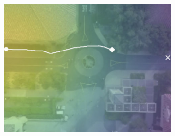 \documentclass[letterpaper,10pt,conference]{ieeeconf}
\begin{document}
\begin{figure}[t!]
\begin{subfigure}[t]{0.48\textwidth}
\begin{minipage}[c]{0.3\linewidth}
		\includegraphics[width=\linewidth]{./figures/comparison/rand_death_1_2_t=370.jpg}
	\end{minipage}
	

\end{subfigure}
\end{figure}
\end{document}
